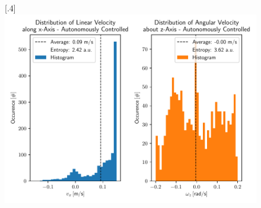 \begin{figure}[h]
	[.4\linewidth]{\includegraphics[scale=.35]{chapters/05_experiments/04_autonomous_walking/semantic_walk_01_entropy.pdf}}
	\caption{}
	\label{fig::53_aw_additional}
\end{figure}



